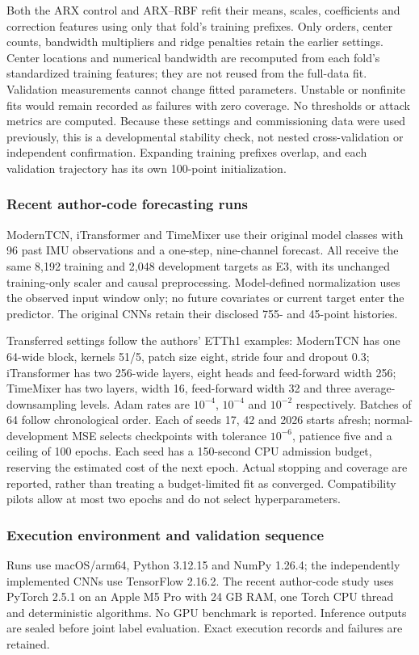 Both the ARX control and ARX--RBF refit their means, scales, coefficients and correction features using only that fold's training prefixes. Only orders, center counts, bandwidth multipliers and ridge penalties retain the earlier settings. Center locations and numerical bandwidth are recomputed from each fold's standardized training features; they are not reused from the full-data fit. Validation measurements cannot change fitted parameters. Unstable or nonfinite fits would remain recorded as failures with zero coverage. No thresholds or attack metrics are computed. Because these settings and commissioning data were used previously, this is a developmental stability check, not nested cross-validation or independent confirmation. Expanding training prefixes overlap, and each validation trajectory has its own 100-point initialization.

\subsubsection{Recent author-code forecasting runs}
ModernTCN, iTransformer and TimeMixer use their original model classes with 96 past IMU observations and a one-step, nine-channel forecast. All receive the same 8,192 training and 2,048 development targets as E3, with its unchanged training-only scaler and causal preprocessing. Model-defined normalization uses the observed input window only; no future covariates or current target enter the predictor. The original CNNs retain their disclosed 755- and 45-point histories.

Transferred settings follow the authors' ETTh1 examples: ModernTCN has one 64-wide block, kernels 51/5, patch size eight, stride four and dropout 0.3; iTransformer has two 256-wide layers, eight heads and feed-forward width 256; TimeMixer has two layers, width 16, feed-forward width 32 and three average-downsampling levels. Adam rates are $10^{-4}$, $10^{-4}$ and $10^{-2}$ respectively. Batches of 64 follow chronological order. Each of seeds 17, 42 and 2026 starts afresh; normal-development MSE selects checkpoints with tolerance $10^{-6}$, patience five and a ceiling of 100 epochs. Each seed has a 150-second CPU admission budget, reserving the estimated cost of the next epoch. Actual stopping and coverage are reported, rather than treating a budget-limited fit as converged. Compatibility pilots allow at most two epochs and do not select hyperparameters.

\subsubsection{Execution environment and validation sequence}
Runs use macOS/arm64, Python 3.12.15 and NumPy 1.26.4; the independently implemented CNNs use TensorFlow 2.16.2. The recent author-code study uses PyTorch 2.5.1 on an Apple M5 Pro with 24 GB RAM, one Torch CPU thread and deterministic algorithms. No GPU benchmark is reported. Inference outputs are sealed before joint label evaluation. Exact execution records and failures are retained.




